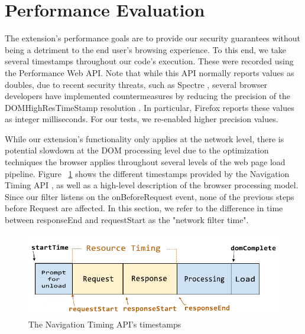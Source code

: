\section{Performance Evaluation} \label{performance}
The extension's performance goals are to provide our security guarantees without being a detriment to the end user's browsing experience. To this end, we take several timestamps throughout our code's execution. These were recorded using the Performance Web API. Note that while this API normally reports values as doubles, due to recent security threats, such as Spectre \cite{DBLP:journals/corr/abs-1801-01203}, several browser developers have implemented countermeasures by reducing the precision of the DOMHighResTimeStamp resolution \cite{reducetimeprecision,resolutionconsiderations}. In particular, Firefox reports these values as integer milliseconds. For our tests, we re-enabled higher precision values.

While our extension's functionality only applies at the network level, there is potential slowdown at the DOM processing level due to the optimization techniques the browser applies throughout several levels of the web page load pipeline. Figure ~\ref{fig:navigationtiming} shows the different timestamps provided by the Navigation Timing API \cite{navigationtiming}, as well as a high-level description of the browser processing model. Since our filter listens on the onBeforeRequest event, none of the previous steps before Request are affected. In this section, we refer to the difference in time between responseEnd and requestStart as the "network filter time".

\begin{figure}[h]
 \includegraphics[scale=0.65]{img/timestamp-diagram-edited.pdf}
 \caption{The Navigation Timing API's timestamps\protect\footnotemark}
 \label{fig:navigationtiming}
 \end{figure}



